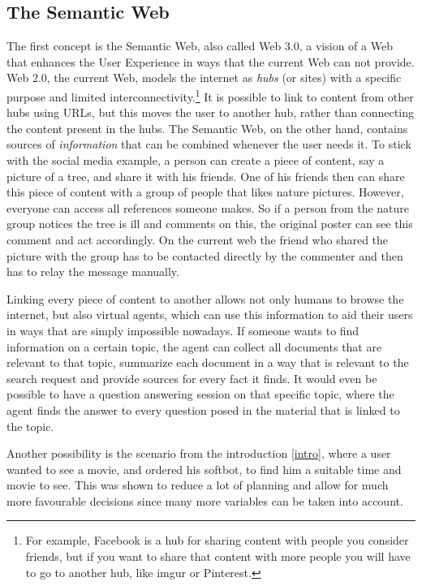 \documentclass{article}
\begin{document}
 \subsection{The Semantic Web}
 The first concept is the Semantic Web, also called Web 3.0, a vision of a Web that enhances the User Experience in ways that the current Web can not provide. Web 2.0, the current Web, models the internet as \textit{hubs} (or sites) with a specific purpose and limited interconnectivity.\footnote{For example, Facebook is a hub for sharing content with people you consider friends, but if you want to share that content with more people you will have to go to another hub, like imgur or Pinterest.} It is possible to link to content from other hubs using URLs, but this moves the user to another hub, rather than connecting the content present in the hubs.
The Semantic Web, on the other hand, contains sources of \textit{information} that can be combined whenever the user needs it. To stick with the social media example, a person can create a piece of content, say a picture of a tree, and share it with his friends. One of his friends then can share this piece of content with a group of people that likes nature pictures. However, everyone can access all references someone makes. So if a person from the nature group notices the tree is ill and comments on this, the original poster can see this comment and act accordingly. On the current web the friend who shared the picture with the group has to be contacted directly by the commenter and then has to relay the message manually.

 Linking every piece of content to another allows not only humans to browse the internet, but also virtual agents, which can use this information to aid their users in ways that are simply impossible nowadays. If someone wants to find information on a certain topic, the agent can collect all documents that are relevant to that topic, summarize each document in a way that is relevant to the search request and provide sources for every fact it finds. It would even be possible to have a question answering session on that specific topic, where the agent finds the answer to every question posed in the material that is linked to the topic.

 Another possibility is the scenario from the introduction \ref{intro}, where a user wanted to see a movie, and ordered his softbot, to find him a suitable time and movie to see. This was shown to reduce a lot of planning and allow for much more favourable decisions since many more variables can be taken into account.
\end{document}

